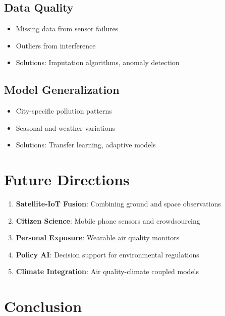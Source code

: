 \documentclass[12pt,a4paper]{article}
\begin{document}
\subsection{Data Quality}

\begin{itemize}
    \item Missing data from sensor failures
    \item Outliers from interference
    \item Solutions: Imputation algorithms, anomaly detection
\end{itemize}

\subsection{Model Generalization}

\begin{itemize}
    \item City-specific pollution patterns
    \item Seasonal and weather variations
    \item Solutions: Transfer learning, adaptive models
\end{itemize}

\section{Future Directions}

\begin{enumerate}
    \item \textbf{Satellite-IoT Fusion}: Combining ground and space observations
    \item \textbf{Citizen Science}: Mobile phone sensors and crowdsourcing
    \item \textbf{Personal Exposure}: Wearable air quality monitors
    \item \textbf{Policy AI}: Decision support for environmental regulations
    \item \textbf{Climate Integration}: Air quality-climate coupled models
\end{enumerate}

\section{Conclusion}
\end{document}
